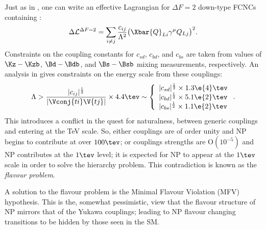 Just as in , one can write an effective Lagrangian for $\Delta F=2$ down-type
FCNCs containing \np:
\begin{equation}
  \Delta\mathcal{L}^{\Delta F=2} =
  \sum_{i\neq j}\frac{c_{ij}}{\Lambda^2}
  \big(\Xbar{Q}_{Li}\gamma^\mu Q_{Lj}\big)^2.
\end{equation}
Constraints on the coupling constants for $c_{sd}$, $c_{bd}$, and $c_{bs}$ are taken from
values of $\Kz-\Kzb$, $\Bd-\Bdb$, and $\Bs-\Bsb$ mixing measurements, respectively.
An analysis in  gives constraints on the energy scale from these couplings:
\begin{equation}
  \Lambda > \frac{|c_{ij}|^\frac12}{|\Vconj{ti}\V{tj}|}\times4.4\tev
  \sim
  \left\{
    \begin{array}{l}
      |c_{sd}|^\frac12\times 1.3\e{4}\tev \\
      |c_{bd}|^\frac12\times 5.1\e{2}\tev \\
      |c_{bs}|^\frac12\times 1.1\e{2}\tev \\
    \end{array}\right..
\end{equation}
This introduces a conflict in the quest for naturalness, between generic couplings and \np entering
at the TeV scale.
So, either couplings are of order unity and NP begins to contribute at over $100\tev$; or couplings
strengths are $\mathrm{O}(10^{-5})$ and NP contributes at the $1\tev$ level;
it is expected for NP to appear at the $1\tev$ scale in order to solve the hierarchy problem.
This contradiction is known as the \emph{flavour problem}.

A solution to the flavour problem is the Minimal Flavour Violation (MFV) hypothesis.
This is the, somewhat pessimistic, view that the flavour structure of NP mirrors that of the Yukawa
couplings; leading to NP flavour changing transitions to be hidden by those seen in the SM.








